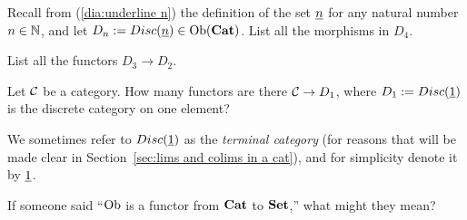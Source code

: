 \documentclass[CT4S-EN-RU]{subfiles}
\begin{document}
\begin{exampleRUS}\label{ex:discrete graph discrete cat}
\end{exampleRUS}

\begin{exerciseENG}
Recall from (\ref{dia:underline n}) the definition of the set $\underline{n}$ for any natural number $n\in{\mathbb N}$, and let $D_n:=Disc(\underline{n})\in\textnormal{Ob}({\mathbf{Cat}})$.
\sexc List all the morphisms in $D_4$. 
\item List all the functors $D_3\to D_2.$
\endsexc
\end{exerciseENG}

\begin{exerciseRUS}
\end{exerciseRUS}

\begin{exerciseENG}\label{exc:term cat}
Let $\mathcal{C}$ be a category. How many functors are there $\mathcal{C}\rightarrow D_1$, where $D_1:=Disc(\underline{1})$ is the discrete category on one element?
\end{exerciseENG}

\begin{exerciseRUS}\label{exc:term cat}
\end{exerciseRUS}

\begin{blockENG}
We sometimes refer to $Disc(\underline{1})$ as the {\em terminal category} (for reasons that will be made clear in Section~\ref{sec:lims and colims in a cat}), and for simplicity denote it by $\underline{1}$.
\end{blockENG}

\begin{blockRUS}
\end{blockRUS}

\begin{exerciseENG}\label{exc:Ob is a functor}
If someone said “$\textnormal{Ob}$ is a functor from ${\mathbf{Cat}}$ to ${\mathbf{Set}}$,” what might they mean? 
\end{exerciseENG}

\begin{exerciseRUS}\label{exc:Ob is a functor}
\end{exerciseRUS}
\end{document}
